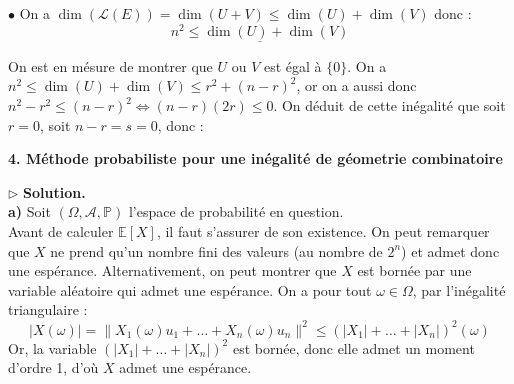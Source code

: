 \documentclass[11pt,a4paper]{report}
\begin{document}
\noindent $\bullet$ On a $\dim(\mathcal{L}(E)) = \dim(U+V) \leqslant \dim(U) + \dim(V)$ donc :
$$ \underline{n^2 \leqslant \dim(U) + \dim(V)} $$

\noindent On est en mésure de montrer que $U$ ou $V$ est égal à $\{0\}$. On a $n^2 \leqslant \dim(U) + \dim(V) \leqslant r^2 + (n-r)^2$, or on a aussi donc $n^2 - r^2 \leqslant (n-r)^2 \Leftrightarrow (n-r)(2r) \leqslant 0$. On déduit de cette inégalité que soit $r=0$, soit $n-r=s=0$, donc :
\begin{center}
\end{center}


\begin{center}

\large \textbf{4. Méthode probabiliste pour une inégalité de géometrie combinatoire}

\end{center}

\vspace{0.2cm}

\noindent{}

\vspace{0.4cm}
\noindent $\triangleright$ \textbf{Solution.} \\
\noindent \textbf{a)} Soit $(\Omega, \mathcal{A}, \mathbb{P})$ l'espace de probabilité en question. \\
Avant de calculer $\mathbb{E}[X]$, il faut s'assurer de son existence. On peut remarquer que $X$ ne prend qu'un nombre fini des valeurs (au nombre de $2^n$) et admet donc une espérance. Alternativement, on peut montrer que $X$ est bornée par une variable aléatoire qui admet une espérance. 
On a pour tout $\omega \in \Omega$, par l'inégalité triangulaire :
$$ |X(\omega)| = \|X_1(\omega)u_1 + \dots + X_n(\omega)u_n\|^2 \leqslant \left(|X_1| + \dots + |X_n|\right)^2(\omega) $$
\noindent Or, la variable $(|X_1| + \dots + |X_n|)^2$ est bornée, donc elle admet un moment d'ordre 1, d'où $X$ admet une espérance.
\end{document}
